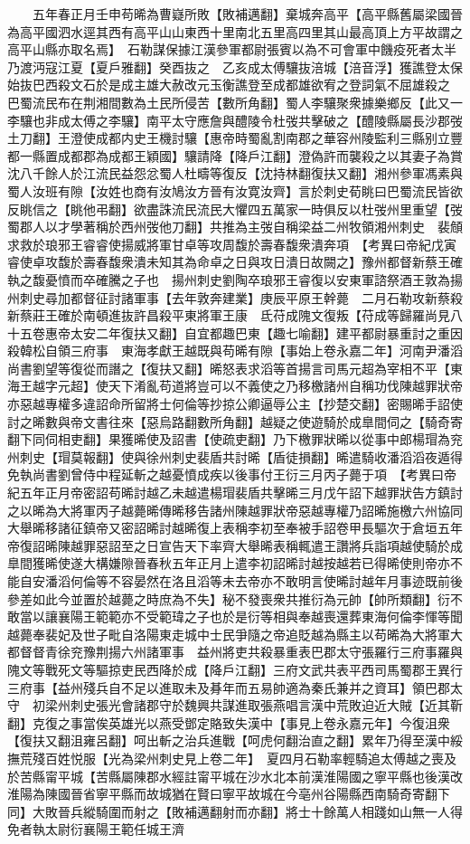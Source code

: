 　　五年春正月壬申苟晞為曹嶷所敗【敗補邁翻】棄城奔高平【高平縣舊屬梁國晉為高平國泗水逕其西有高平山山東西十里南北五里高四里其山最高頂上方平故謂之高平山縣亦取名焉】　石勒謀保據江漢參軍都尉張賓以為不可會軍中饑疫死者太半乃渡沔寇江夏【夏戶雅翻】癸酉抜之　乙亥成太傅驤抜涪城【涪音浮】獲譙登太保始抜巴西殺文石於是成主雄大赦改元玉衡譙登至成都雄欲宥之登詞氣不屈雄殺之　巴蜀流民布在荆湘間數為土民所侵苦【數所角翻】蜀人李驤聚衆據樂鄉反【此又一李驤也非成太傅之李驤】南平太守應詹與醴陵令杜弢共擊破之【醴陵縣屬長沙郡弢土刀翻】王澄使成都内史王機討驤【惠帝時蜀亂割南郡之華容州陵監利三縣别立豐都一縣置成都郡為成都王穎國】驤請降【降戶江翻】澄偽許而襲殺之以其妻子為賞沈八千餘人於江流民益怨忿蜀人杜疇等復反【沈持林翻復扶又翻】湘州參軍馮素與蜀人汝班有隙【汝姓也商有汝鳩汝方晉有汝寛汝齊】言於刺史荀眺曰巴蜀流民皆欲反眺信之【眺他弔翻】欲盡誅流民流民大懼四五萬家一時俱反以杜弢州里重望【弢蜀郡人以才學著稱於西州弢他刀翻】共推為主弢自稱梁益二州牧領湘州刺史　裴頠求救於琅邪王睿睿使揚威將軍甘卓等攻周馥於壽春馥衆潰奔項　【考異曰帝紀戊寅睿使卓攻馥於壽春馥衆潰未知其為命卓之日與攻日潰日故闕之】豫州都督新蔡王確執之馥憂憤而卒確騰之子也　揚州刺史劉陶卒琅邪王睿復以安東軍諮祭酒王敦為揚州刺史尋加都督征討諸軍事【去年敦奔建業】庚辰平原王幹薨　二月石勒攻新蔡殺新蔡莊王確於南頓進抜許昌殺平東將軍王康　氐苻成隗文復叛【苻成等歸羅尚見八十五卷惠帝太安二年復扶又翻】自宜都趣巴東【趣七喻翻】建平都尉暴重討之重因殺韓松自領三府事　東海孝獻王越既與苟晞有隙【事始上卷永嘉二年】河南尹潘滔尚書劉望等復從而譖之【復扶又翻】晞怒表求滔等首揚言司馬元超為宰相不平【東海王越字元超】使天下淆亂苟道將豈可以不義使之乃移檄諸州自稱功伐陳越罪狀帝亦惡越專權多違詔命所留將士何倫等抄掠公卿逼辱公主【抄楚交翻】密賜晞手詔使討之晞數與帝文書往來【惡烏路翻數所角翻】越疑之使遊騎於成臯間伺之【騎奇寄翻下同伺相吏翻】果獲晞使及詔書【使疏吏翻】乃下檄罪狀晞以從事中郎楊瑁為兖州刺史【瑁莫報翻】使與徐州刺史裴盾共討晞【盾徒損翻】晞遣騎收潘滔滔夜遁得免執尚書劉曾侍中程延斬之越憂憤成疾以後事付王衍三月丙子薨于項　【考異曰帝紀五年正月帝密詔苟晞討越乙未越遣楊瑁裴盾共擊晞三月戊午詔下越罪狀告方鎮討之以晞為大將軍丙子越薨晞傳晞移告諸州陳越罪狀帝惡越專權乃詔晞施檄六州協同大舉晞移諸征鎮帝又密詔晞討越晞復上表稱李初至奉被手詔卷甲長驅次于倉垣五年帝復詔晞陳越罪惡詔至之日宣告天下率齊大舉晞表稱輒遣王讚將兵詣項越使騎於成臯間獲晞使遂大構嫌隙晉春秋五年正月上遣李初詔晞討越按越若已得晞使則帝亦不能自安潘滔何倫等不容晏然在洛且滔等未去帝亦不敢明言使晞討越年月事迹既前後參差如此今並置於越薨之時庶為不失】秘不發喪衆共推衍為元帥【帥所類翻】衍不敢當以讓襄陽王範範亦不受範瑋之子也於是衍等相與奉越喪還葬東海何倫李惲等聞越薨奉裴妃及世子毗自洛陽東走城中士民爭隨之帝追貶越為縣主以苟晞為大將軍大都督督青徐兖豫荆揚六州諸軍事　益州將吏共殺暴重表巴郡太守張羅行三府事羅與隗文等戰死文等驅掠吏民西降於成【降戶江翻】三府文武共表平西司馬蜀郡王異行三府事【益州殘兵自不足以進取未及朞年而五易帥適為秦氏兼并之資耳】領巴郡太守　初梁州刺史張光會諸郡守於魏興共謀進取張燕唱言漢中荒敗迫近大賊【近其靳翻】克復之事當俟英雄光以燕受鄧定賂致失漢中【事見上卷永嘉元年】今復沮衆【復扶又翻沮雍呂翻】呵出斬之治兵進戰【呵虎何翻治直之翻】累年乃得至漢中綏撫荒殘百姓悦服【光為梁州刺史見上卷二年】　夏四月石勒率輕騎追太傅越之喪及於苦縣甯平城【苦縣屬陳郡水經註甯平城在沙水北本前漢淮陽國之寧平縣也後漢改淮陽為陳國晉省寧平縣而故城猶在賢曰寧平故城在今亳州谷陽縣西南騎奇寄翻下同】大敗晉兵縱騎圍而射之【敗補邁翻射而亦翻】將士十餘萬人相踐如山無一人得免者執太尉衍襄陽王範任城王濟